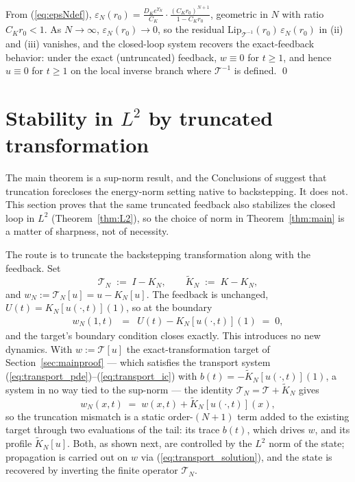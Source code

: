 \documentclass[10pt,a4paper]{amsart}
\newcommand{\Tcal}{\mathcal{T}}
\newcommand{\Ltwo}{L^2}
\newcommand{\LipT}{\mathrm{Lip}_{\Tcal^{-1}}}
\newcommand{\eps}{\varepsilon}
\begin{document}
From (\ref{eq:epsNdef}), $\eps_N(r_0) = \frac{D_K e^{\Upsilon_K}}{C_K}\cdot \frac{(C_K r_0)^{N+1}}{1 - C_K r_0}$, geometric in $N$ with ratio $C_K r_0 < 1$. As $N \to \infty$, $\eps_N(r_0) \to 0$, so the residual $\LipT(r_0)\,\eps_N(r_0)$ in (ii) and (iii) vanishes, and the closed-loop system recovers the exact-feedback behavior: under the exact (untruncated) feedback, $w \equiv 0$ for $t \ge 1$, and hence $u \equiv 0$ for $t \ge 1$ on the local inverse branch where $\Tcal^{-1}$ is defined. \qed

\section{Stability in $\Ltwo$ by truncated transformation}\label{sec:L2}

The main theorem is a sup-norm result, and the Conclusions of \cite{krstic2026feedbacklinearizationhyperbolicpdes} suggest that truncation forecloses the energy-norm setting native to backstepping. It does not. This section proves that the same truncated feedback also stabilizes the closed loop in $\Ltwo$ (Theorem~\ref{thm:L2}), so the choice of norm in Theorem~\ref{thm:main} is a matter of sharpness, not of necessity.

The route is to truncate the backstepping transformation along with the feedback. Set
\begin{equation}
\Tcal_N \;:=\; I - K_N, \qquad \widetilde K_N \;:=\; K - K_N,
\label{eq:TNdef}
\end{equation}
and $w_N := \Tcal_N[u] = u - K_N[u]$. The feedback is unchanged, $U(t) = K_N[u(\cdot,t)](1)$, so at the boundary
\begin{eqnarray}
w_N(1,t) &=& U(t) - K_N[u(\cdot,t)](1) \;=\; 0,
\label{eq:wN_bdy}
\end{eqnarray}
and the target's boundary condition closes exactly. This introduces no new dynamics. With $w := \Tcal[u]$ the exact-transformation target of Section~\ref{sec:mainproof} --- which satisfies the transport system (\ref{eq:transport_pde})--(\ref{eq:transport_ic}) with $b(t) = -\widetilde K_N[u(\cdot,t)](1)$, a system in no way tied to the sup-norm --- the identity $\Tcal_N = \Tcal + \widetilde K_N$ gives
\begin{equation}
w_N(x,t) \;=\; w(x,t) + \widetilde K_N[u(\cdot,t)](x),
\label{eq:wN_decomp}
\end{equation}
so the truncation mismatch is a static order-$(N{+}1)$ term added to the existing target through two evaluations of the tail: its trace $b(t)$, which drives $w$, and its profile $\widetilde K_N[u]$. Both, as shown next, are controlled by the $\Ltwo$ norm of the state; propagation is carried out on $w$ via (\ref{eq:transport_solution}), and the state is recovered by inverting the finite operator $\Tcal_N$.
\end{document}
